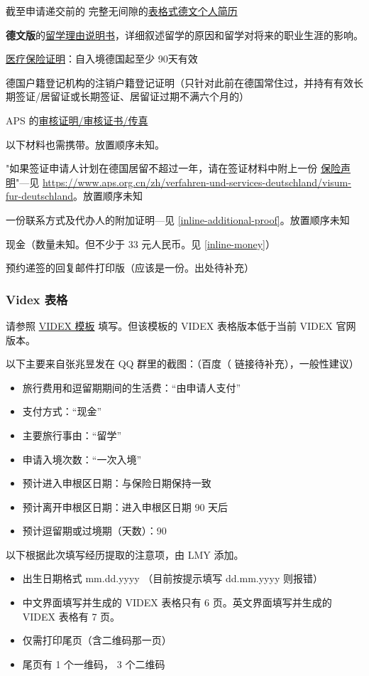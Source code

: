 \documentclass{article}
\begin{document}
\begin{enumerate}
\item 截至申请递交前的
完整无间隙的\underline{表格式德文个人简历}
\item \textbf{德文版}的\underline{留学理由说明书}，详细叙述留学的原因和留学对将来的职业生涯的影响。
\item \underline{医疗保险证明}：自入境德国起至少 90天有效
{\color{gray}\item 德国户籍登记机构的注销户籍登记证明（只针对此前在德国常住过，并持有有效长期签证/居留证或长期签证、居留证过期不满六个月的）}
\item APS 的\underline{审核证明/审核证书/传真}

\vbox{}
{\color{gray}
以下材料也需携带。放置顺序未知。}
\item\label{inline-ensurance-acknowledgement} "如果签证申请人计划在德国居留不超过一年，请在签证材料中附上一份 \href{https://www.aps.org.cn/wp-content/uploads/Belehrung_KV.pdf}{保险声明}"---见 \url{https://www.aps.org.cn/zh/verfahren-und-services-deutschland/visum-fur-deutschland}。放置顺序未知
\item 一份联系方式及代办人的附加证明---见 \ref{inline-additional-proof}。放置顺序未知
\item 现金（数量未知。但不少于 33 元人民币。见 \ref{inline-money}）
\item 预约递签的回复邮件打印版（应该是一份。出处待补充）
\end{enumerate}

\subsubsection{Videx 表格}
请参照 \href{https://www.aps.org.cn/wp-content/uploads/Beispiel-Videx.pdf}{VIDEX 模板} 填写。但该模板的 VIDEX 表格版本低于当前 VIDEX 官网版本。

以下主要来自张兆昱发在 QQ 群里的截图：（百度（%
链接待补充），一般性建议）
\begin{itemize}
\item 旅行费用和逗留期期间的生活费：“由申请人支付”
\item 支付方式：“现金”
\item 主要旅行事由：“留学”
\item 申请入境次数：“一次入境”
\item 预计进入申根区日期：与保险日期保持一致
\item 预计离开申根区日期：进入申根区日期 90 天后
\item 预计逗留期或过境期（天数）：90
\end{itemize}
以下根据此次填写经历提取的注意项，由 LMY 添加。
\begin{itemize}
  \item 出生日期格式 mm.dd.yyyy （目前按提示填写 dd.mm.yyyy 则报错）
  \item 中文界面填写并生成的 VIDEX 表格只有 6 页。英文界面填写并生成的 VIDEX 表格有 7 页。
  \item 仅需打印尾页（含二维码那一页）
  \item 尾页有 1 个一维码， 3 个二维码
\end{itemize}
\end{document}
